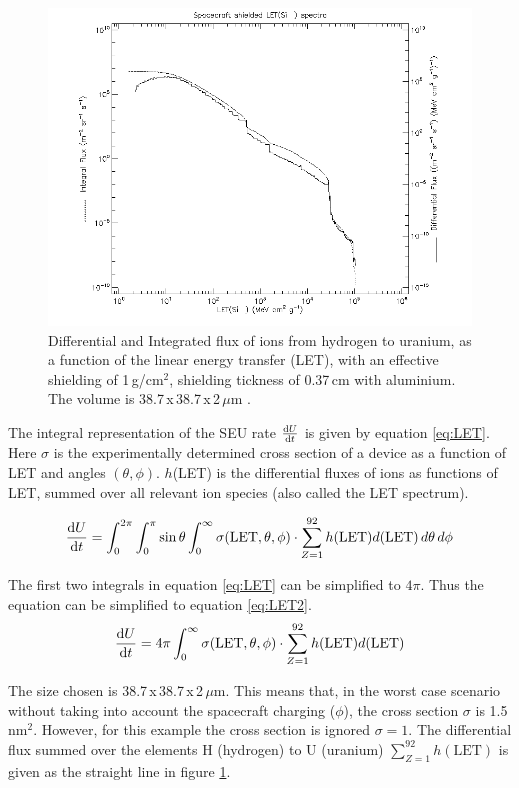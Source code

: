 \begin{figure}[H]
\centering
\includegraphics[width=.9\textwidth]{figures/LET-shielding.png}
\caption{Differential and Integrated flux of ions from hydrogen to uranium, as a function of the linear energy transfer (LET), with an effective shielding of 1\,g/cm$^2$, shielding tickness of 0.37\,cm with aluminium. The volume is 38.7\,x\,38.7\,x\,2\,$\mu$m \cite{SPENVIS}.}
\label{fig:LET-shielding}
\end{figure}

The integral representation of the SEU rate $\dv{U}{t}$ is given by equation \ref{eq:LET}. Here $\sigma$ is the experimentally determined cross section of a device as a function of LET and angles $(\theta,\phi)$. $h$(LET) is the differential fluxes of ions as functions of LET, summed over all relevant ion species (also called the LET spectrum).

\begin{equation}
\dv{U}{t} = \int^{2 \pi}_0 \int^\pi_0 \sin{\theta} \int^{\infty}_0 \sigma(\text{LET}, \theta, \phi) \cdot \sum^{92}_{Z=1} h(\text{LET}) d(\text{LET}) \,d\theta\,d\phi \label{eq:LET}
\end{equation}

The first two integrals in equation \ref{eq:LET} can be simplified to $4 \pi$. Thus the equation can be simplified to equation \ref{eq:LET2}.
\begin{equation}
\dv{U}{t} = 4 \pi \int^{\infty}_0 \sigma(\text{LET}, \theta, \phi) \cdot \sum^{92}_{Z=1} h(\text{LET}) d(\text{LET})\label{eq:LET2}
\end{equation}

The size chosen is 38.7\,x\,38.7\,x\,2\,$\mu$m. This means that, in the worst case scenario without taking into account the spacecraft charging ($\phi$), the cross section $\sigma$ is 1.5\,nm$^2$. However, for this example the cross section is ignored $\sigma = 1$. The differential flux summed over the elements H (hydrogen) to U (uranium) $\sum^{92}_{Z=1} h(\text{LET})$ is given as the straight line in figure \ref{fig:LET-shielding}.\\

